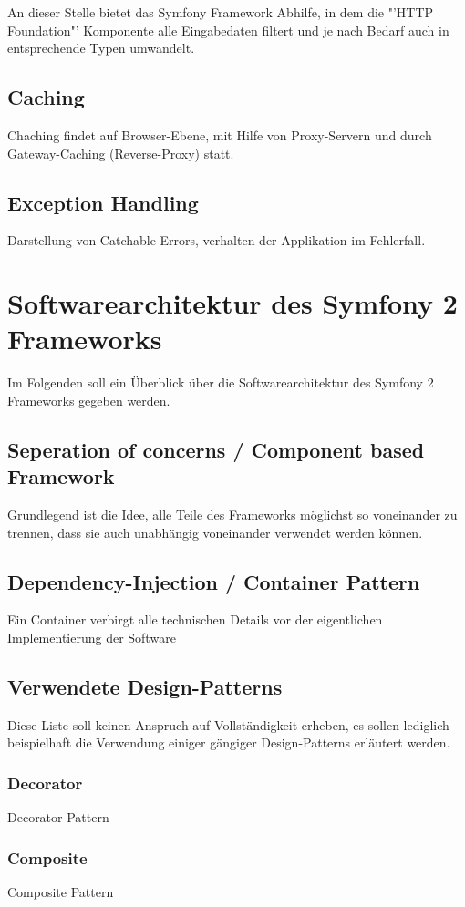\documentclass[12pt]{report}
\begin{document}
An dieser Stelle bietet das Symfony Framework Abhilfe, in dem die "'HTTP Foundation"' Komponente alle Eingabedaten filtert und je nach Bedarf auch in entsprechende Typen umwandelt.\cite{sf2:HTTPFoundation}

\section{Caching}
Chaching findet auf Browser-Ebene, mit Hilfe von Proxy-Servern und durch Gateway-Caching (Reverse-Proxy) statt.

\section{Exception Handling}
Darstellung von Catchable Errors, verhalten der Applikation im Fehlerfall.


\chapter{Softwarearchitektur des Symfony 2 Frameworks}
\label{sec:symfony}
Im Folgenden soll ein Überblick über die Softwarearchitektur des Symfony 2 Frameworks gegeben werden.
\section{Seperation of concerns / Component based Framework}
Grundlegend ist die Idee, alle Teile des Frameworks möglichst so voneinander zu trennen, dass sie auch unabhängig voneinander verwendet werden können.
\section{Dependency-Injection / Container Pattern}
Ein Container verbirgt alle technischen Details vor der eigentlichen Implementierung der Software
\section{Verwendete Design-Patterns}
Diese Liste soll keinen Anspruch auf Vollständigkeit erheben, es sollen lediglich beispielhaft die Verwendung einiger gängiger Design-Patterns erläutert werden.
\subsection{Decorator}
Decorator Pattern
\subsection{Composite}
Composite Pattern
\end{document}
